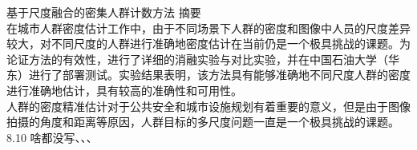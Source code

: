 \documentclass{article}
\begin{document}
	基于尺度融合的密集人群计数方法
摘要\\
在城市人群密度估计工作中，由于不同场景下人群的密度和图像中人员的尺度差异较大，对不同尺度的人群进行准确地密度估计在当前仍是一个极具挑战的课题。为论证方法的有效性，进行了详细的消融实验与对比实验，并在中国石油大学（华东）进行了部署测试。实验结果表明，该方法具有能够准确地不同尺度人群的密度进行准确地估计，具有较高的准确性和可用性。\\
人群的密度精准估计对于公共安全和城市设施规划有着重要的意义，但是由于图像拍摄的角度和距离等原因，人群目标的多尺度问题一直是一个极具挑战的课题。
8.10
啥都没写、、、
\end{document}
